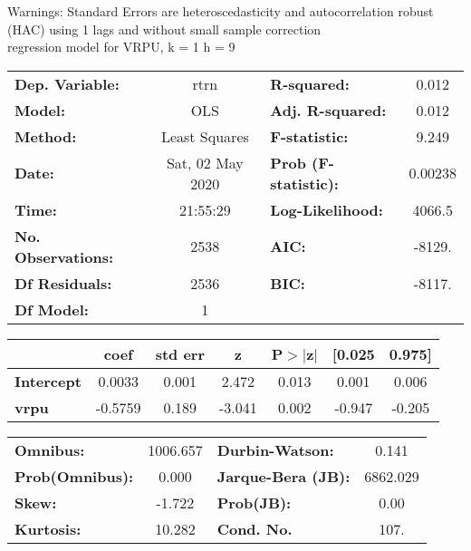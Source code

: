 Warnings: \newline
 [1] Standard Errors are heteroscedasticity and autocorrelation robust (HAC) using 1 lags and without small sample correction\\ 

regression model for VRPU, k = 1 h = 9\begin{center}
\begin{tabular}{lclc}
\toprule
\textbf{Dep. Variable:}    &       rtrn       & \textbf{  R-squared:         } &     0.012   \\
\textbf{Model:}            &       OLS        & \textbf{  Adj. R-squared:    } &     0.012   \\
\textbf{Method:}           &  Least Squares   & \textbf{  F-statistic:       } &     9.249   \\
\textbf{Date:}             & Sat, 02 May 2020 & \textbf{  Prob (F-statistic):} &  0.00238    \\
\textbf{Time:}             &     21:55:29     & \textbf{  Log-Likelihood:    } &    4066.5   \\
\textbf{No. Observations:} &        2538      & \textbf{  AIC:               } &    -8129.   \\
\textbf{Df Residuals:}     &        2536      & \textbf{  BIC:               } &    -8117.   \\
\textbf{Df Model:}         &           1      & \textbf{                     } &             \\
\bottomrule
\end{tabular}
\begin{tabular}{lcccccc}
                   & \textbf{coef} & \textbf{std err} & \textbf{z} & \textbf{P$> |$z$|$} & \textbf{[0.025} & \textbf{0.975]}  \\
\midrule
\textbf{Intercept} &       0.0033  &        0.001     &     2.472  &         0.013        &        0.001    &        0.006     \\
\textbf{vrpu}      &      -0.5759  &        0.189     &    -3.041  &         0.002        &       -0.947    &       -0.205     \\
\bottomrule
\end{tabular}
\begin{tabular}{lclc}
\textbf{Omnibus:}       & 1006.657 & \textbf{  Durbin-Watson:     } &    0.141  \\
\textbf{Prob(Omnibus):} &   0.000  & \textbf{  Jarque-Bera (JB):  } & 6862.029  \\
\textbf{Skew:}          &  -1.722  & \textbf{  Prob(JB):          } &     0.00  \\
\textbf{Kurtosis:}      &  10.282  & \textbf{  Cond. No.          } &     107.  \\
\bottomrule
\end{tabular}
\end{center}

